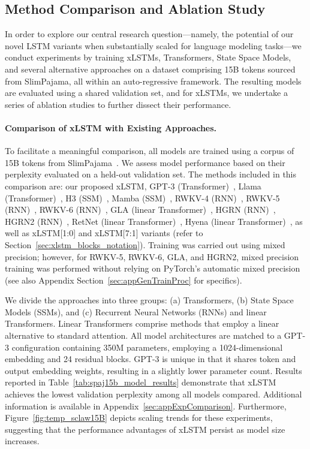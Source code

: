 \subsection{Method Comparison and Ablation Study}
\label{sec:ExpComparison}

In order to explore our central research question—namely, the potential of our novel LSTM variants when substantially scaled for language modeling tasks—we conduct experiments by training xLSTMs, Transformers, State Space Models, and several alternative approaches on a dataset comprising 15B tokens sourced from SlimPajama, all within an auto-regressive framework. The resulting models are evaluated using a shared validation set, and for xLSTMs, we undertake a series of ablation studies to further dissect their performance.

\paragraph{Comparison of xLSTM with Existing Approaches.} To facilitate a meaningful comparison, all models are trained using a corpus of 15B tokens from SlimPajama~\citep{Soboleva:23}. We assess model performance based on their perplexity evaluated on a held-out validation set. The methods included in this comparison are: our proposed xLSTM, GPT-3 (Transformer)~\citep{Brown:20short}, Llama (Transformer)~\citep{Touvron:23arxiv}, H3 (SSM)~\citep{Fu:23}, Mamba (SSM)~\citep{Gu:24arxiv}, RWKV-4 (RNN)~\citep{Peng:23arxivshort}, RWKV-5 (RNN)~\citep{Peng:24arxivshort}, RWKV-6 (RNN)~\citep{Peng:24arxivshort}, GLA (linear Transformer)~\citep{Yang:23arxiv}, HGRN (RNN)~\citep{Qin:23}, HGRN2 (RNN)~\citep{Qin:24arxiv}, RetNet (linear Transformer)~\citep{Sun:23arxiv}, Hyena (linear Transformer)~\citep{Poli:23}, as well as xLSTM[1:0] and xLSTM[7:1] variants (refer to Section~\ref{sec:xlstm_blocks_notation}). Training was carried out using mixed precision; however, for RWKV-5, RWKV-6, GLA, and HGRN2, mixed precision training was performed without relying on PyTorch’s automatic mixed precision (see also Appendix Section~\ref{sec:appGenTrainProc} for specifics).

We divide the approaches into three groups: (a) Transformers, (b) State Space Models (SSMs), and (c) Recurrent Neural Networks (RNNs) and linear Transformers. Linear Transformers comprise methods that employ a linear alternative to standard attention. All model architectures are matched to a GPT-3 configuration containing 350M parameters, employing a 1024-dimensional embedding and 24 residual blocks. GPT-3 is unique in that it shares token and output embedding weights, resulting in a slightly lower parameter count. Results reported in Table~\ref{tab:spaj15b_model_results} demonstrate that xLSTM achieves the lowest validation perplexity among all models compared. Additional information is available in Appendix~\ref{sec:appExpComparison}. Furthermore, Figure~\ref{fig:temp_sclaw15B} depicts scaling trends for these experiments, suggesting that the performance advantages of xLSTM persist as model size increases.

